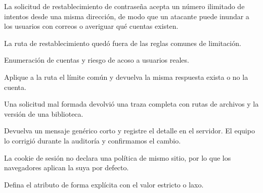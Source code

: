 \begin{finding}[id=F-02,title={El restablecimiento de contraseña no tiene límite de intentos},
    severity=high,likelihood=4,impact=4,effort=medium,status=open]
  \findingpart{\lblDescription}
  La solicitud de restablecimiento de contraseña acepta un número ilimitado de
  intentos desde una misma dirección, de modo que un atacante puede inundar a
  los usuarios con correos o averiguar qué cuentas existen.

  \findingpart{\lblRootCause}
  La ruta de restablecimiento quedó fuera de las reglas comunes de limitación.

  \findingpart{\lblImpact}
  Enumeración de cuentas y riesgo de acoso a usuarios reales.

  \findingpart{\lblRecommendation}
  Aplique a la ruta el límite común y devuelva la misma respuesta exista o no
  la cuenta.

  \findingpart{\lblEvidence}
  \begin{evidence}
  \end{evidence}
\end{finding}

\begin{finding}[id=F-03,title={Las páginas de error revelan detalles internos},
    severity=medium,likelihood=3,impact=3,effort=small,status=fixed]
  \findingpart{\lblDescription}
  Una solicitud mal formada devolvió una traza completa con rutas de archivos y
  la versión de una biblioteca.

  \findingpart{\lblRecommendation}
  Devuelva un mensaje genérico corto y registre el detalle en el servidor. El
  equipo lo corrigió durante la auditoría y confirmamos el cambio.

  \findingpart{\lblEvidence}
  \begin{evidence}
  \end{evidence}
\end{finding}

\begin{finding}[id=F-04,title={La cookie de sesión no define el atributo de mismo sitio},
    severity=low,likelihood=2,impact=2,effort=small,status=open]
  \findingpart{\lblDescription}
  La cookie de sesión no declara una política de mismo sitio, por lo que los
  navegadores aplican la suya por defecto.

  \findingpart{\lblRecommendation}
  Defina el atributo de forma explícita con el valor estricto o laxo.

  \findingpart{\lblEvidence}
  \begin{evidence}
  \end{evidence}
\end{finding}


